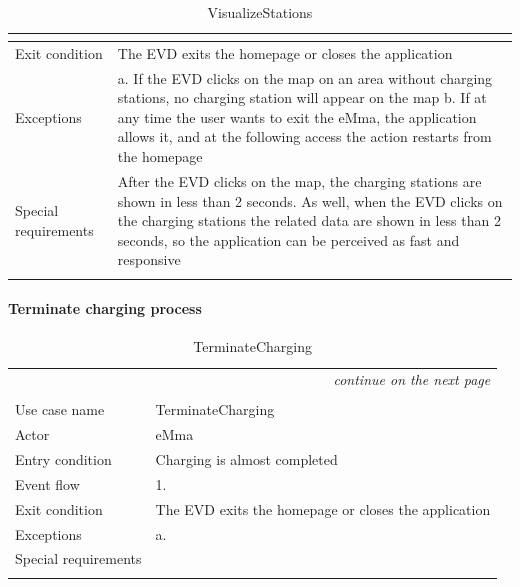 \begin{center}
\begin{longtable}{p{4cm} p{11cm}}
\begin{adjustwidth}{0.5cm}{}
\begin{itemize}
                        \end{itemize}
                    \end{adjustwidth}   
     \\
     \hline
     Exit condition & The EVD exits the homepage or closes the application \\
     \hline
     Exceptions &   a. If the EVD clicks on the map on an area without charging stations, no charging station will appear on the map \newline
                    b. If at any time the user wants to exit the eMma, the application allows it, and at the following access the action restarts from the homepage \\
     \hline
     Special requirements & After the EVD clicks on the map, the charging stations are shown in less than 2 seconds. As well, when the EVD clicks on the charging stations the related data are shown in less than 2 seconds, so the application can be perceived as fast and responsive \\
     \hline
    \caption{VisualizeStations}
    \label{tab:VisualizeStations}
    \end{longtable}
\end{center}

\paragraph{Terminate charging process}
\begin{center}
    \begin{longtable}{p{4cm} p{11cm}}
    \multicolumn{2}{r}{\itshape{continue on the next page}}\\
    \endfoot 
    \\
    \endlastfoot
    \hline
     Use case name &  TerminateCharging\\
     \hline
     Actor & eMma \\
     \hline
     Entry condition & Charging is almost completed \\
     \hline
     Event flow &   1.
     \\
     \hline
     Exit condition & The EVD exits the homepage or closes the application \\
     \hline
     Exceptions &   a.\\
     \hline
     Special requirements & \\
     \hline
    \caption{TerminateCharging}
    \label{tab:TerminateCharging}
    \end{longtable}
\end{center}

